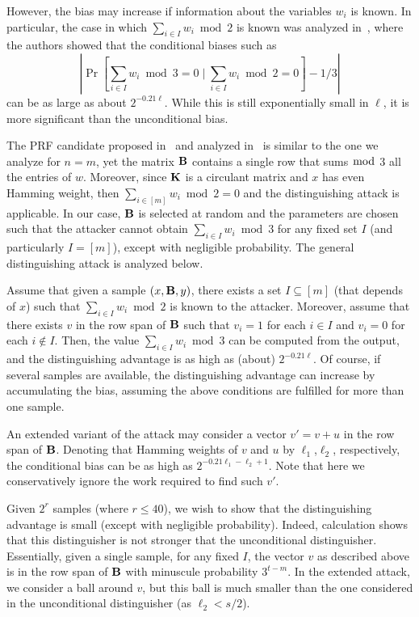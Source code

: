 However, the bias may increase if information about the variables $w_i$ is known.
In particular, the case in which $\sum_{i \in I} w_i \bmod 2$ is known was analyzed in~\cite{CheonCKK20},
where the authors showed that the conditional biases such as
$$\left| \Pr \left[\sum_{i \in I} w_i \bmod 3 = 0 \mid \sum_{i \in I} w_i \bmod 2 = 0 \right] - 1/3 \right|$$
can be as large as about $2^{-0.21\ell}$.
While this is still exponentially small in $\ell$,
it is more significant than the unconditional bias.

The PRF candidate proposed in~\cite{boneh2018-darkmatter} and analyzed in~\cite{CheonCKK20}
is similar to the one we analyze for $n = m$,
yet the matrix $\mat{B}$ contains a single row that sums $\bmod$ 3 all the entries of $w$.
Moreover, since $\mat{K}$ is a circulant matrix and $x$ has even Hamming weight,
then $\sum_{i \in [m]} w_i \bmod 2 = 0$ and the distinguishing attack is applicable.
In our case, $\mat{B}$ is selected at random and the parameters are chosen
such that the attacker cannot obtain $\sum_{i \in I} w_i \bmod 3$ for any fixed set $I$ (and particularly $I = [m]$),
except with negligible probability.
The general distinguishing attack is analyzed below.

Assume that given a sample $(x,\mat{B},y)$,
there exists a set $I \subseteq [m]$ (that depends of $x$)
such that $\sum_{i \in I} w_i \bmod 2$ is known to the attacker.
Moreover, assume that there exists $v$ in the row span of $\mat{B}$
such that $v_i = 1$ for each $i \in I$ and $v_i = 0$
for each $i \notin I$.
Then, the value $\sum_{i \in I} w_i \bmod 3$ can be computed from
the output, and the distinguishing advantage is as high as (about) $2^{-0.21\ell}$.
Of course, if several samples are available, the distinguishing advantage can
increase by accumulating the bias,
assuming the above conditions are fulfilled for more than one sample.

An extended variant of the attack may consider a vector
$v' = v + u$ in the row span of $\mat{B}$.
Denoting that Hamming weights of $v$ and $u$ by $\ell_1$,$\ell_2$, respectively,
the conditional bias can be as high as $2^{-0.21\ell_1 - \ell_2 + 1}$.
Note that here we conservatively ignore the work required to find such $v'$.

Given $2^r$ samples (where $r \leq 40$),
we wish to show that the distinguishing advantage is small
(except with negligible probability).
Indeed, calculation shows that this distinguisher is not stronger that the
unconditional distinguisher.
Essentially, given a single sample, for any fixed $I$, the vector $v$ as described above
is in the row span of $\mat{B}$ with minuscule probability $3^{t - m}$.
In the extended attack, we consider a ball around $v$, but this ball
is much smaller than the one considered in the unconditional distinguisher (as $\ell_2 < s/2$).

